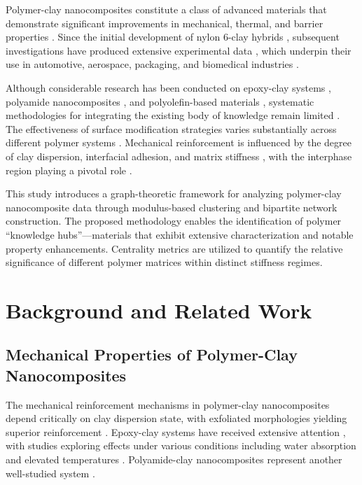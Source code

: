 \documentclass[conference]{IEEEtran}
\begin{document}
Polymer-clay nanocomposites constitute a class of advanced materials that demonstrate significant improvements in mechanical, thermal, and barrier properties \cite{42, 68, 92, 112}. Since the initial development of nylon 6-clay hybrids \cite{147, 148}, subsequent investigations have produced extensive experimental data \cite{127, 140, 143}, which underpin their use in automotive, aerospace, packaging, and biomedical industries \cite{56, 67}.

Although considerable research has been conducted on epoxy-clay systems \cite{15, 24, 55, 92}, polyamide nanocomposites \cite{80, 107, 118, 124}, and polyolefin-based materials \cite{91, 125, 134, 135}, systematic methodologies for integrating the existing body of knowledge remain limited \cite{68, 91}. The effectiveness of surface modification strategies varies substantially across different polymer systems \cite{1, 69, 90, 107, 138}. Mechanical reinforcement is influenced by the degree of clay dispersion, interfacial adhesion, and matrix stiffness \cite{10, 22, 25}, with the interphase region playing a pivotal role \cite{8, 11, 13, 14, 17}.

This study introduces a graph-theoretic framework for analyzing polymer-clay nanocomposite data through modulus-based clustering and bipartite network construction. The proposed methodology enables the identification of polymer ``knowledge hubs''---materials that exhibit extensive characterization and notable property enhancements. Centrality metrics are utilized to quantify the relative significance of different polymer matrices within distinct stiffness regimes.

\section{Background and Related Work}

\subsection{Mechanical Properties of Polymer-Clay Nanocomposites}

The mechanical reinforcement mechanisms in polymer-clay nanocomposites depend critically on clay dispersion state, with exfoliated morphologies yielding superior reinforcement \cite{10, 25}. Epoxy-clay systems have received extensive attention \cite{92, 59, 15, 24, 55}, with studies exploring effects under various conditions including water absorption \cite{26, 39, 65} and elevated temperatures \cite{70}. Polyamide-clay nanocomposites represent another well-studied system \cite{80, 64, 88, 107, 117, 129, 133}.
\end{document}
